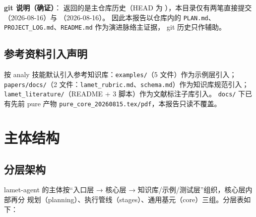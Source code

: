 \documentclass[UTF8]{ctexart}
\begin{document}
\textbf{git 说明（确证）}：\texttt{} 返回的是主仓库历史（HEAD 为
\texttt{}），本目录仅有两笔直接提交
\texttt{}（2026-08-16）与 \texttt{}（2026-08-16）。
因此本报告以仓库内的 \texttt{PLAN.md}、\texttt{PROJECT\_LOG.md}、\texttt{README.md} 作为演进脉络主证据，
git 历史只作辅助。

\subsection{参考资料引入声明}

按 analy 技能默认引入参考知识库：\texttt{examples/}（5 文件）作为示例层引入；
\texttt{papers/docs/}（2 文件：\texttt{lamet\_rubric.md}、\texttt{schema.md}）作为知识库规范引入；
\texttt{lamet\_literature/}（README + 3 脚本）作为文献标注子库引入。
\texttt{docs/} 下已有先前 pure 产物 \texttt{pure\_core\_20260815.tex/pdf}，本报告只读不覆盖。

\section{主体结构}

\subsection{分层架构}

lamet-agent 的主体按“入口层 → 核心层 → 知识库/示例/测试层”组织，核心层内部再分
规划（planning）、执行管线（stages）、通用基元（core）三组。分层表如下：
\end{document}
